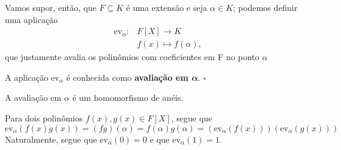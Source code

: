 \documentclass[../algebraIII_notes.tex]{subfiles}
\begin{document}
Vamos supor, então, que \(F\subseteq K\) é uma extensão e seja \(\alpha \in K\); podemos definir uma aplicação
\begin{align*}
	\mathrm{ev}_{\alpha }: & F[X]\rightarrow K           \\
	                       & f(x)\longmapsto f(\alpha ),
\end{align*}
que justamente avalia os polinômios com coeficientes em F no ponto \(\alpha \)
\begin{def*}
	A aplicação \(\mathrm{ev}_{\alpha }\) é conhecida como \textbf{avaliação em \(\mathbf{\alpha }\)}. \(\square\)
\end{def*}
\begin{lemma*}
	A avaliação em \(\alpha \) é um homomorfismo de anéis.
\end{lemma*}
\begin{proof*}
	Para dois polinômios \(f(x), g(x)\in F[X]\), segue que
	\[
		\mathrm{ev}_{\alpha }(f(x)g(x))=(fg)(\alpha )=f(\alpha )g(\alpha )=(\mathrm{ev}_{\alpha }(f(x)))(\mathrm{ev}_{\alpha }(g(x)))
	\]
	Naturalmente, segue que \(\mathrm{ev}_{\alpha }(0)=0\) e que \(\mathrm{ev}_{\alpha }(1)=1\). \qedsymbol
\end{proof*}
\end{document}
